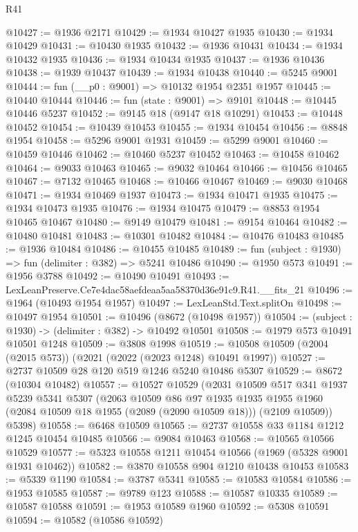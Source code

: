 \begin{lexlean}{R41}
\begin{coremodule}
@10427 := @1936 @2171
@10429 := @1934 @10427 @1935
@10430 := @1934 @10429
@10431 := @10430 @1935
@10432 := @1936 @10431
@10434 := @1934 @10432 @1935
@10436 := @1934 @10434 @1935
@10437 := @1936 @10436
@10438 := @1939 @10437
@10439 := @1934 @10438
@10440 := @5245 @9001
@10444 := fun (__p0 : @9001) => @10132 @1954 @2351 @1957
@10445 := @10440 @10444
@10446 := fun (state : @9001) => @9101
@10448 := @10445 @10446 @5237
@10452 := @9145 @18 (@9147 @18 @10291)
@10453 := @10448 @10452
@10454 := @10439 @10453
@10455 := @1934 @10454
@10456 := @8848 @1954
@10458 := @5296 @9001 @1931
@10459 := @5299 @9001
@10460 := @10459 @10446
@10462 := @10460 @5237 @10452
@10463 := @10458 @10462
@10464 := @9033 @10463
@10465 := @9032 @10464
@10466 := @10456 @10465
@10467 := @7132 @10465
@10468 := @10466 @10467
@10469 := @9030 @10468
@10471 := @1934 @10469 @1937
@10473 := @1934 @10471 @1935
@10475 := @1934 @10473 @1935
@10476 := @1934 @10475
@10479 := @8853 @1954 @10465 @10467
@10480 := @9149 @10479
@10481 := @9154 @10464
@10482 := @10480 @10481
@10483 := @10301 @10482
@10484 := @10476 @10483
@10485 := @1936 @10484
@10486 := @10455 @10485
@10489 := fun (subject : @1930) => fun (delimiter : @382) => @5241 @10486
@10490 := @1950 @573
@10491 := @1956 @3788
@10492 := @10490 @10491
@10493 := LexLeanPreserve.Ce7e4dac58aefdeaa5aa58370d36e91c9.R41.__fits_21
@10496 := @1964 (@10493 @1954 @1957)
@10497 := LexLeanStd.Text.splitOn
@10498 := @10497 @1954
@10501 := @10496 (@8672 (@10498 @1957))
@10504 := (subject : @1930) -> (delimiter : @382) -> @10492 @10501
@10508 := @1979 @573 @10491 @10501 @1248
@10509 := @3808 @1998
@10519 := @10508 @10509 (@2004 (@2015 @573)) (@2021 (@2022 (@2023 @1248) @10491 @1997))
@10527 := @2737 @10509 @28 @120 @519 @1246 @5240 @10486 @5307
@10529 := @8672 (@10304 @10482)
@10557 := @10527
    @10529
    (@2031
      @10509
      @517
      @341
      @1937
      @5239
      @5341
      @5307
      (@2063
        @10509
        @86
        @97
        @1935
        @1935
        @1955
        @1960
        (@2084 @10509 @18 @1955 (@2089 (@2090 @10509 @18)))
        (@2109 @10509))
      @5398)
@10558 := @6468 @10509
@10565 := @2737 @10558 @33 @1184 @1212 @1245 @10454 @10485
@10566 := @9084 @10463
@10568 := @10565 @10566 @10529
@10577 := @5323 @10558 @1211 @10454 @10566 (@1969 (@5328 @9001 @1931 @10462))
@10582 := @3870 @10558 @904 @1210 @10438 @10453
@10583 := @5339 @1190
@10584 := @3787 @5341
@10585 := @10583 @10584
@10586 := @1953 @10585
@10587 := @9789 @123
@10588 := @10587 @10335
@10589 := @10587 @10588
@10591 := @1953 @10589 @1960
@10592 := @5308 @10591
@10594 := @10582 (@10586 @10592)

\end{coremodule}
\end{lexlean}

